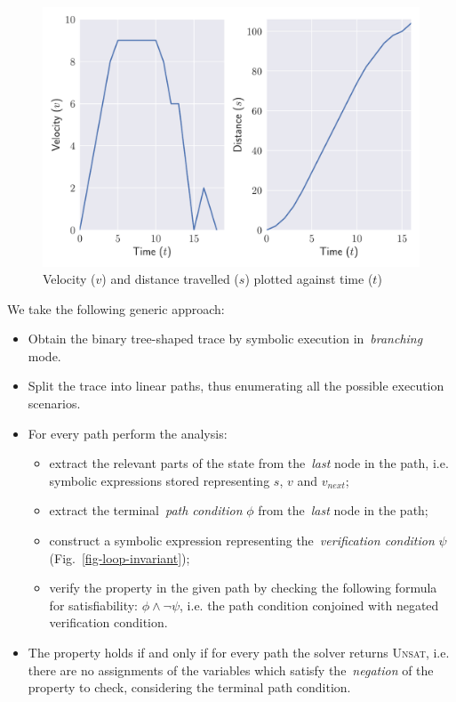 \begin{figure}
\centerline{\includegraphics[scale=0.50]{fig/motor_control_graph.pdf}}
\caption{Velocity ($v$) and distance travelled ($s$) plotted against time ($t$)\label{fig-motor}}
\end{figure}

\noindent
We take the following generic approach:

\begin{itemize}
  \item Obtain the binary tree-shaped trace by symbolic execution in~\emph{branching} mode.
  \item Split the trace into linear paths, thus enumerating all the possible
    execution scenarios.
  \item For every path perform the analysis:
    \begin{itemize}
      \item extract the relevant parts of the state from the~\emph{last} node in
        the path, i.e. symbolic expressions stored representing $s$,
        $v$ and $v_{next}$;
      \item extract the terminal~\emph{path condition} $\phi$
            from the~\emph{last} node in the path;
      \item construct a symbolic expression representing the~\emph{verification condition}
            $\psi$ (Fig.~\ref{fig-loop-invariant});
      \item verify the property in the given path by checking the following
        formula for satisfiability: $\phi \land \lnot\psi$, i.e. the path condition
        conjoined with negated verification condition.

    \end{itemize}
    \item  The property holds if and only if for every path the solver returns
           \textsc{Unsat}, i.e. there are no assignments of the variables which
           satisfy the~\emph{negation} of the property to check, considering the
           terminal path condition.
\end{itemize}

